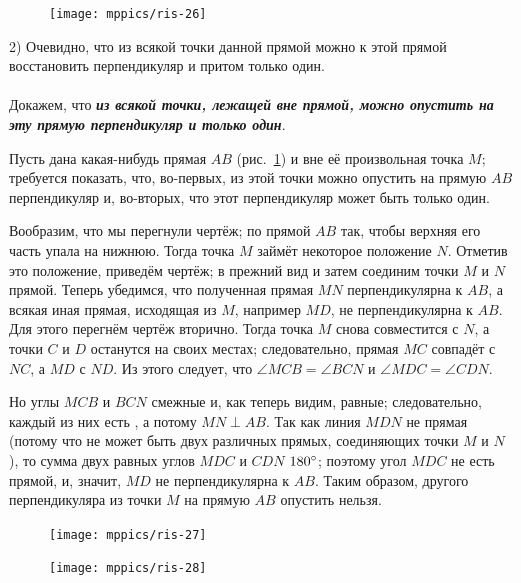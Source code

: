 \documentclass[oneside]{book}
\begin{document}
\begin{figure}
\centering
\texttt{[image: mppics/ris-26]}
\caption{}\label{1938/ris-26}
\end{figure}

2) Очевидно, что из всякой точки данной прямой можно к этой прямой восстановить перпендикуляр и притом только один.

\paragraph{}\label{1938/24}
Докажем, что \textbf{\emph{из всякой точки, лежащей вне прямой, можно опустить на эту прямую перпендикуляр и только один}}.

Пусть дана какая-нибудь прямая $AB$ (рис.~\ref{1938/ris-26}) и вне её произвольная точка $M$;
требуется показать, что, во-первых, из этой точки можно опустить на прямую $AB$ перпендикуляр и, во-вторых, что этот перпендикуляр может быть только один.

Вообразим, что мы перегнули чертёж;
по прямой $AB$ так, чтобы верхняя его часть упала на нижнюю.
Тогда точка $M$ займёт некоторое положение $N$.
Отметив это положение, приведём чертёж;
в прежний вид и затем соединим точки $M$ и $N$ прямой.
Теперь убедимся, что полученная прямая $MN$ перпендикулярна к $AB$, а всякая иная прямая, исходящая из $M$, например $MD$, не перпендикулярна к $AB$.
Для этого перегнём чертёж вторично.
Тогда точка $M$ снова совместится с $N$, а точки $C$ и $D$ останутся на своих местах;
следовательно, прямая $MC$ совпадёт с $NC$, а $MD$ с $ND$.
Из этого следует, что $\angle MCB = \angle BCN$ и $\angle MDC = \angle CDN$.


Но углы $MCB$ и $BCN$ смежные и, как теперь видим, равные;
следовательно, каждый из них есть , а потому $MN\perp AB$.
Так как линия $MDN$ не прямая (потому что не может быть двух различных прямых, соединяющих точки $M$ и $N$), то сумма двух равных углов $MDC$ и $CDN$  $180\degree$;
поэтому угол $MDC$ не есть прямой, и, значит, $MD$ не перпендикулярна к $AB$.
Таким образом, другого перпендикуляра из точки $M$ на прямую $AB$ опустить нельзя.

\begin{figure}
\vskip-6mm
\centering
\texttt{[image: mppics/ris-27]}
\caption{}\label{1938/ris-27}
\bigskip
\texttt{[image: mppics/ris-28]}
\caption{}\label{1938/ris-28}
\end{figure}
\end{document}
